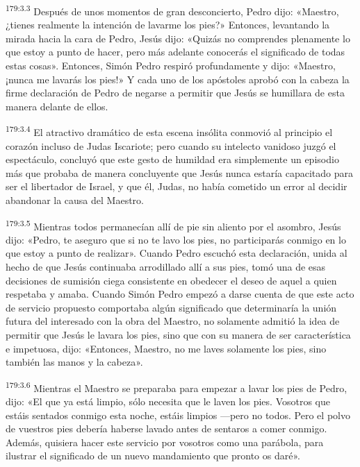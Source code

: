 \par 
\textsuperscript{179:3.3} Después de unos momentos de gran desconcierto, Pedro dijo: «Maestro, ¿tienes realmente la intención de lavarme los pies?» Entonces, levantando la mirada hacia la cara de Pedro, Jesús dijo: «Quizás no comprendes plenamente lo que estoy a punto de hacer, pero más adelante conocerás el significado de todas estas cosas». Entonces, Simón Pedro respiró profundamente y dijo: «Maestro, ¡nunca me lavarás los pies!» Y cada uno de los apóstoles aprobó con la cabeza la firme declaración de Pedro de negarse a permitir que Jesús se humillara de esta manera delante de ellos.

\par 
\textsuperscript{179:3.4} El atractivo dramático de esta escena insólita conmovió al principio el corazón incluso de Judas Iscariote; pero cuando su intelecto vanidoso juzgó el espectáculo, concluyó que este gesto de humildad era simplemente un episodio más que probaba de manera concluyente que Jesús nunca estaría capacitado para ser el libertador de Israel, y que él, Judas, no había cometido un error al decidir abandonar la causa del Maestro.

\par 
\textsuperscript{179:3.5} Mientras todos permanecían allí de pie sin aliento por el asombro, Jesús dijo: «Pedro, te aseguro que si no te lavo los pies, no participarás conmigo en lo que estoy a punto de realizar». Cuando Pedro escuchó esta declaración, unida al hecho de que Jesús continuaba arrodillado allí a sus pies, tomó una de esas decisiones de sumisión ciega consistente en obedecer el deseo de aquel a quien respetaba y amaba. Cuando Simón Pedro empezó a darse cuenta de que este acto de servicio propuesto comportaba algún significado que determinaría la unión futura del interesado con la obra del Maestro, no solamente admitió la idea de permitir que Jesús le lavara los pies, sino que con su manera de ser característica e impetuosa, dijo: «Entonces, Maestro, no me laves solamente los pies, sino también las manos y la cabeza».

\par 
\textsuperscript{179:3.6} Mientras el Maestro se preparaba para empezar a lavar los pies de Pedro, dijo: «El que ya está limpio, sólo necesita que le laven los pies. Vosotros que estáis sentados conmigo esta noche, estáis limpios ---pero no todos. Pero el polvo de vuestros pies debería haberse lavado antes de sentaros a comer conmigo. Además, quisiera hacer este servicio por vosotros como una parábola, para ilustrar el significado de un nuevo mandamiento que pronto os daré».

